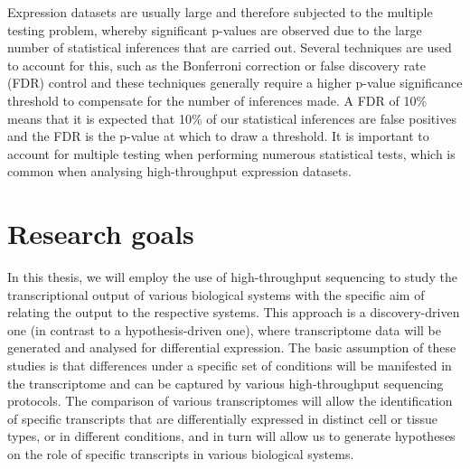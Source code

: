 Expression datasets are usually large and therefore subjected to the multiple testing problem, whereby significant p-values are observed due to the large number of statistical inferences that are carried out. Several techniques are used to account for this, such as the Bonferroni correction or false discovery rate (FDR) control \citep{fdr_paper} and these techniques generally require a higher p-value significance threshold to compensate for the number of inferences made. A FDR of 10\% means that it is expected that 10\% of our statistical inferences are false positives and the FDR is the p-value at which to draw a threshold. It is important to account for multiple testing when performing numerous statistical tests, which is common when analysing high-throughput expression datasets.

\section{Research goals}

In this thesis, we will employ the use of high-throughput sequencing to study the transcriptional output of various biological systems with the specific aim of relating the output to the respective systems. This approach is a discovery-driven one (in contrast to a hypothesis-driven one), where transcriptome data will be generated and analysed for differential expression. The basic assumption of these studies is that differences under a specific set of conditions will be manifested in the transcriptome and can be captured by various high-throughput sequencing protocols. The comparison of various transcriptomes will allow the identification of specific transcripts that are differentially expressed in distinct cell or tissue types, or in different conditions, and in turn will allow us to generate hypotheses on the role of specific transcripts in various biological systems.
